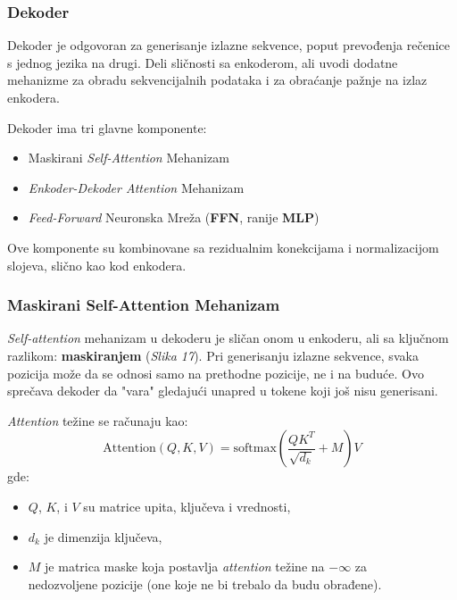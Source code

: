 \documentclass[12pt]{article}
\begin{document}
   \subsubsection{Dekoder}
   Dekoder je odgovoran za generisanje izlazne sekvence, poput prevođenja rečenice s jednog jezika 
   na drugi. Deli sličnosti sa enkoderom, ali uvodi dodatne mehanizme za obradu sekvencijalnih 
   podataka i za obraćanje pažnje na izlaz enkodera.

   Dekoder ima tri glavne komponente:
   \begin{itemize}
      \item Maskirani \textit{Self-Attention} Mehanizam
      \item \textit{Enkoder-Dekoder Attention} Mehanizam
      \item \textit{Feed-Forward} Neuronska Mreža (\textbf{FFN}, ranije \textbf{MLP})
   \end{itemize}

   Ove komponente su kombinovane sa rezidualnim konekcijama i 
   normalizacijom slojeva, slično kao kod enkodera.

   \subsubsection*{Maskirani Self-Attention Mehanizam}
   \textit{Self-attention} mehanizam u dekoderu je sličan onom u enkoderu, ali sa 
   ključnom razlikom: \textbf{maskiranjem} (\textit{Slika 17}). Pri generisanju izlazne sekvence, 
   svaka pozicija može da se odnosi samo na prethodne pozicije, ne i na buduće. 
   Ovo sprečava dekoder da "vara" gledajući unapred u tokene koji još nisu generisani.

   \textit{Attention} težine se računaju kao:
   \[
   \text{Attention}(Q, K, V) = \text{softmax}\left(\frac{QK^T}{\sqrt{d_k}} + M\right)V
   \]
   \vspace{-0.7cm}
   gde:
   \begin{itemize}
      \item \( Q \), \( K \), i \( V \) su matrice upita, ključeva i vrednosti,
      \item \( d_k \) je dimenzija ključeva,
      \item \( M \) je matrica maske koja postavlja \textit{attention} težine na
      $-\infty$ za \\ nedozvoljene pozicije (one koje ne bi trebalo da budu obrađene).
   \end{itemize}
\end{document}
